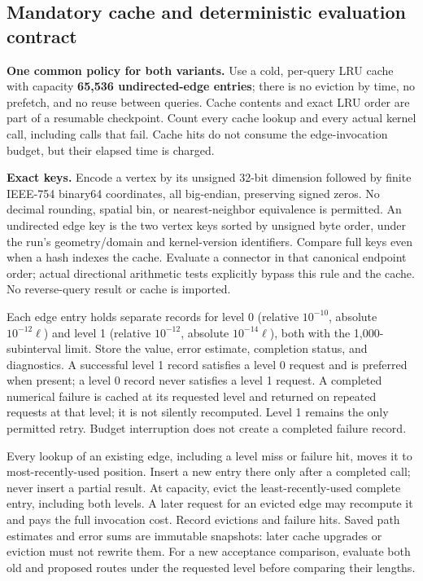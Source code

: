 \documentclass[11pt,letterpaper]{article}
\begin{document}
\subsection{Mandatory cache and deterministic evaluation contract}\label{sec:cache-contract}
\textbf{One common policy for both variants.} Use a cold, per-query LRU cache with capacity \textbf{65,536 undirected-edge entries}; there is no eviction by time, no prefetch, and no reuse between queries. Cache contents and exact LRU order are part of a resumable checkpoint. Count every cache lookup and every actual kernel call, including calls that fail. Cache hits do not consume the edge-invocation budget, but their elapsed time is charged.

\textbf{Exact keys.} Encode a vertex by its unsigned 32-bit dimension followed by finite IEEE-754 binary64 coordinates, all big-endian, preserving signed zeros. No decimal rounding, spatial bin, or nearest-neighbor equivalence is permitted. An undirected edge key is the two vertex keys sorted by unsigned byte order, under the run's geometry/domain and kernel-version identifiers. Compare full keys even when a hash indexes the cache. Evaluate a connector in that canonical endpoint order; actual directional arithmetic tests explicitly bypass this rule and the cache. No reverse-query result or cache is imported.

Each edge entry holds separate records for level 0 (relative $10^{-10}$, absolute $10^{-12}\ell$) and level 1 (relative $10^{-12}$, absolute $10^{-14}\ell$), both with the 1,000-subinterval limit. Store the value, error estimate, completion status, and diagnostics. A successful level 1 record satisfies a level 0 request and is preferred when present; a level 0 record never satisfies a level 1 request. A completed numerical failure is cached at its requested level and returned on repeated requests at that level; it is not silently recomputed. Level 1 remains the only permitted retry. Budget interruption does not create a completed failure record.

Every lookup of an existing edge, including a level miss or failure hit, moves it to most-recently-used position. Insert a new entry there only after a completed call; never insert a partial result. At capacity, evict the least-recently-used complete entry, including both levels. A later request for an evicted edge may recompute it and pays the full invocation cost. Record evictions and failure hits. Saved path estimates and error sums are immutable snapshots: later cache upgrades or eviction must not rewrite them. For a new acceptance comparison, evaluate both old and proposed routes under the requested level before comparing their lengths.
\end{document}
